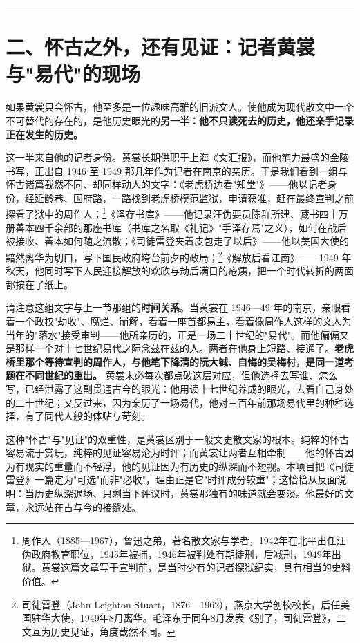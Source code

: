 \documentclass[UTF8,fontset=none,zihao=-4,a4paper]{ctexart}
\begin{document}
\medskip\hrule\medskip

\section{二、怀古之外，还有见证：记者黄裳与"易代"的现场}


如果黄裳只会怀古，他至多是一位趣味高雅的旧派文人。使他成为现代散文中一个不可替代的存在的，是他历史眼光的\textbf{另一半：他不只读死去的历史，他还亲手记录正在发生的历史。}


这一半来自他的记者身份。黄裳长期供职于上海《文汇报》，而他笔力最盛的金陵书写，正出自 1946 至 1949 那几年作为记者在南京的亲历。于是我们看到一组与怀古诸篇截然不同、却同样动人的文字：《老虎桥边看"知堂"》——他以记者身份，经延龄巷、国府路，一路找到老虎桥模范监狱，申请获准，赶在最终宣判之前探看了狱中的周作人；\footnote{周作人（1885—1967），鲁迅之弟，著名散文家与学者，1942年在北平出任汪伪政府教育职位，1945年被捕，1946年被判处有期徒刑，后减刑，1949年出狱。黄裳这篇文章写于宣判前，是当时少有的记者探狱纪实，具有相当的史料价值。}《泽存书库》——他记录汪伪要员陈群所建、藏书四十万册善本四千余部的那座书库（书库之名取《礼记》"手泽存焉"之义），如何在战后被接收、善本如何随之流散；《司徒雷登夹着皮包走了以后》——他以美国大使的黯然离华为切口，写下国民政府垮台前夕的政局；\footnote{司徒雷登（John Leighton Stuart，1876—1962），燕京大学创校校长，后任美国驻华大使，1949年8月离华。毛泽东于同年8月发表《别了，司徒雷登》，二文互为历史见证，角度截然不同。}《解放后看江南》——1949 年秋天，他同时写下人民迎接解放的欢欣与劫后满目的疮痍，把一个时代转折的两面都按在了纸上。


请注意这组文字与上一节那组的\textbf{时间关系}。当黄裳在 1946—49 年的南京，亲眼看着一个政权"劫收"、腐烂、崩解，看着一座首都易主，看着像周作人这样的文人为当年的"落水"接受审判——他所亲历的，正是一场二十世纪的"易代"。而他偏偏又是那样一个对十七世纪易代之际念兹在兹的人。两者在他身上短路、接通了。\textbf{老虎桥里那个等待宣判的周作人，与他笔下降清的阮大铖、自悔的吴梅村，是同一道考题在不同世纪的重出。} 黄裳未必每次都点破这层对应，但他选择去写谁、怎么写，已经泄露了这副贯通古今的眼光：他用读十七世纪养成的眼光，去看自己身处的二十世纪；又反过来，因为亲历了一场易代，他对三百年前那场易代里的种种选择，有了同代人般的体贴与苛刻。


这种"怀古"与"见证"的双重性，是黄裳区别于一般文史散文家的根本。纯粹的怀古容易流于赏玩，纯粹的见证容易沦为时评；而黄裳让两者互相牵制——他的怀古因为有现实的重量而不轻浮，他的见证因为有历史的纵深而不短视。本项目把《司徒雷登》一篇定为"可选"而非"必收"，理由正是它"时评成分较重"；这恰恰从反面说明：当历史纵深退场、只剩当下评议时，黄裳那独有的味道就会变淡。他最好的文章，永远站在古与今的接缝处。
\end{document}
